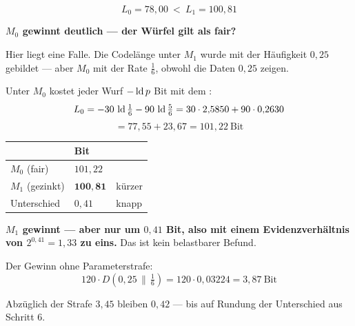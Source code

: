 \begin{aufgabe}
\[ L_0 = 78{,}00 \ <\ L_1 = 100{,}81 \]

\begin{center}
\begin{minipage}{0.9\textwidth}
\textbf{$M_0$ gewinnt deutlich --- der Würfel gilt als fair?}
\end{minipage}
\end{center}

Hier liegt eine Falle. Die Codelänge unter $M_1$ wurde mit der  Häufigkeit $0{,}25$ gebildet --- aber $M_0$ mit der  Rate $\frac16$, obwohl die Daten $0{,}25$ zeigen.

 Unter $M_0$ kostet jeder Wurf $-\operatorname{ld} p$ Bit mit dem :
\[ L_0 = -30\,\operatorname{ld}\tfrac16 - 90\,\operatorname{ld}\tfrac56 = 30\cdot2{,}5850 + 90\cdot0{,}2630 \]
\[ = 77{,}55 + 23{,}67 = 101{,}22 \ \text{Bit} \]

\begin{center}
\renewcommand{\arraystretch}{1.48}
\begin{tabular}{@{}P{2.4cm}P{2.4cm}P{2.4cm}@{}}
\toprule
& \textbf{Bit} & \\
\midrule
$M_0$ (fair) & $101{,}22$ & \\
$M_1$ (gezinkt) & $\mathbf{100{,}81}$ & \textcolor{gruen}{kürzer}\\
\midrule
Unterschied & $0{,}41$ & knapp\\
\bottomrule
\end{tabular}
\end{center}

\begin{center}
\begin{minipage}{0.9\textwidth}
\textbf{$M_1$ gewinnt --- aber nur um $0{,}41$ Bit, also mit einem Evidenzverhältnis von $2^{0{,}41} = 1{,}33$ zu eins.} Das ist kein belastbarer Befund.
\end{minipage}
\end{center}

Der Gewinn ohne Parameterstrafe:
\[ 120\cdot D(0{,}25\,\|\,\tfrac16) = 120\cdot0{,}03224 = 3{,}87 \ \text{Bit} \]

Abzüglich der Strafe $3{,}45$ bleiben $0{,}42$ --- bis auf Rundung der Unterschied aus Schritt 6. \checkmark

\begin{center}
\begin{minipage}{0.88\textwidth}
\end{minipage}
\end{center}


\end{aufgabe}
